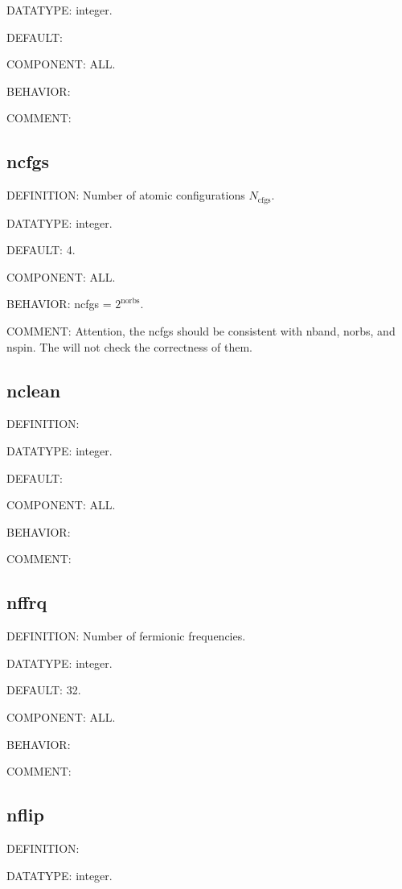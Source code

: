 {\color{green}DATATYPE:} integer.

{\color{blue}DEFAULT:}

{\color{brown}COMPONENT:} ALL.

{\color{purple}BEHAVIOR:}

{\color{olive}COMMENT:}

\subsection{ncfgs}
{\color{red}DEFINITION:} Number of atomic configurations $N_{\text{cfgs}}$.

{\color{green}DATATYPE:} integer.

{\color{blue}DEFAULT:} 4.

{\color{brown}COMPONENT:} ALL.

{\color{purple}BEHAVIOR:} ncfgs = $2^{\text{norbs}}$.

{\color{olive}COMMENT:} Attention, the ncfgs should be consistent with nband, norbs, and nspin. The {\iqist} will not check the 
correctness of them.

\subsection{nclean}
{\color{red}DEFINITION:}

{\color{green}DATATYPE:} integer.

{\color{blue}DEFAULT:}

{\color{brown}COMPONENT:} ALL.

{\color{purple}BEHAVIOR:}

{\color{olive}COMMENT:}

\subsection{nffrq}
{\color{red}DEFINITION:} Number of fermionic frequencies.

{\color{green}DATATYPE:} integer.

{\color{blue}DEFAULT:} 32.

{\color{brown}COMPONENT:} ALL.

{\color{purple}BEHAVIOR:}

{\color{olive}COMMENT:}

\subsection{nflip}
{\color{red}DEFINITION:}

{\color{green}DATATYPE:} integer.

